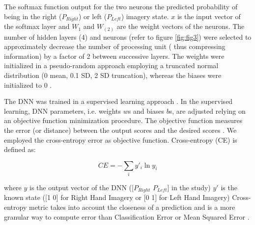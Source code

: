 \documentclass[12pt ]{iopart}
\begin{document}
The softmax function output for the two neurons  the predicted probability of being in the right ($P_{Right}$) or left ($P_{Left}$) imagery state. 
$x$ is the input vector of the softmax layer and $W_{1}$ and $W_(2)$ are the weight vectors of the neurons.
The number of hidden layers (4) and neurons (refer to figure \ref{fig:fig3}) were selected to approximately decrease the number of processing unit ( thus compressing information) by a factor of 2 between successive layers. 
The weights were initialized in a pseudo-random approach employing a truncated normal distribution (0 mean, 0.1 SD, 2 SD truncation), whereas the biases were initialized to 0 \parencite{sutskever2013importance}.

The DNN was trained in a supervised learning approach \parencite{hastie2009overview}.
In the supervised learning, DNN parameters, i.e. weights $w$s and biases $b$s, are adjusted relying on an objective function minimization procedure. The objective function measures the error (or distance) between the output scores and the desired scores . We employed the cross-entropy error as objective function.
Cross-entropy (CE) is defined as:

\begin{equation}
CE=
-\sum\limits_i y'_{i}\ln y_{i}
\end{equation}

where $y$ is the output vector of the DNN ([$P_{Right}$  $P_{Left}$] in the study) $y'$ is the known state ([1 0] for Right Hand Imagery or [0 1] for Left Hand Imagery)
 Cross-entropy metric takes into account the closeness of a prediction and is a more granular way to compute error than Classification Error or Mean Squared Error \parencite{murphy2012machine}.
 
\end{document}
